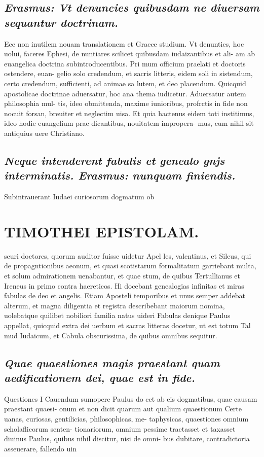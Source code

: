 \documentclass{article}
\begin{document}
\begin{pages}
\subsection*{\textit{Erasmus: Vt denuncies quibusdam ne diuersam sequantur doctrinam. }}\pstart Ece non inutilem nouam translationem et Graece studium. Vt denunties, hoc uolui, faceres Ephesi, de nuntiares scilicet quibusdam iudaizantibus et ali- am ab euangelica doctrina subintroducentibus. Pri mum officium praelati et doctoris ostendere, euan- gelio solo credendum, et sacris litteris, eidem soli in sistendum, certo credendum, sufficienti, ad animae sa lutem, et deo placendum.  \pend\pstart Quicquid apostolicae doctrinae aduersatur, hoc ana thema iudicetur. Aduersatur autem philosophia mul- tis, ideo obmittenda, maxime iunioribus, profrctis in fide non nocuit forsan, breuiter et neglectim uisa. Et quia hactenus eidem toti institimus, ideo hodie euangelium prae dicantibus, nouitatem impropera- mus, cum nihil sit antiquius uere Christiano.  \pend
{}
{}
\subsection*{\textit{Neque intenderent fabulis et genealo gnjs interminatis. Erasmus: nunquam finiendis. }}\pstart Subintrauerant Iudaei curiosorum dogmatum ob  \pend
\section*{TIMOTHEI EPISTOLAM. }
\marginpar{[ p.13 ]}\pstart scuri doctores, quorum auditor fuisse uidetur Apel les, valentinus, et Sileus, qui de propagntionibus aeonum, et quasi scotistarum formalitatum garriebant multa, et solum admirationem uenabantur, et quae stum, de quibus Tertullianus et Ireneus in primo contra haereticos. Hi docebant genealogias infinitas et miras fabulas de deo et angelis. Etiam Aposteli temporibus et unus semper addebat alterum, et magna diligentia et registra describebant maiorum nomina, uolebatque quilibet nobiliori familia natus uideri  \pend\pstart Fabulas denique Paulus appellat, quicquid extra dei uerbum et sacras litteras docetur, ut est totum Tal mud Iudaicum, et Cabula obscurissima, de quibus omnibus sequitur.  \pend
{}
{}
\subsection*{\textit{Quae quaestiones magis praestant quam aedificationem dei, quae est in fide. }}\pstart Questiones I Cauendum sumopere Paulus do cet ab eis dogmatibus, quae causam praestant quaesi- onum et non dicit quarum aut qualium quaestionum Certe uanas, curiosas, gentilicias, philosophicas, me- taphysicas, quaestiones omnium scholaflicorum senten- tionariorum, omnium pessime tractasset et taxasset diuinus Paulus, quibus nihil discitur, nisi de omni- bus dubitare, contradictoria asseuerare, fallendo uin  \pend

\end{pages}
\end{document}
